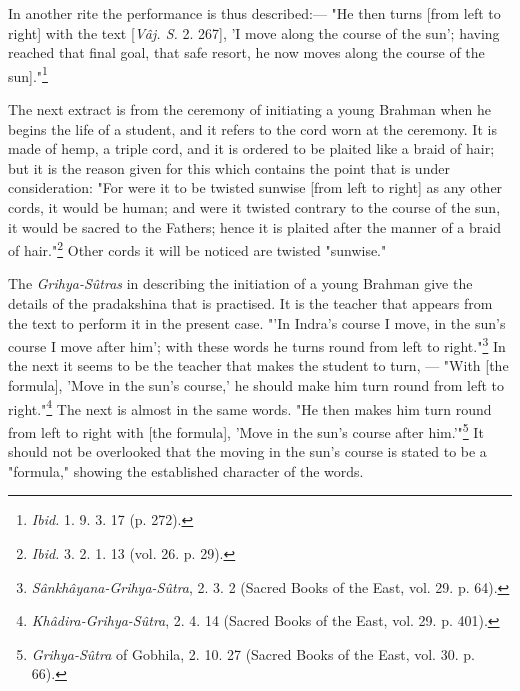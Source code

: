 \documentclass[a4paper, 11pt, oneside, polutonikogreek, english]{article}
\begin{document}
In another rite the performance is thus described:--- "He then turns [from left to right] with the text [\emph{Vâj. S.} 2. 267], 'I move along the course of the sun'; having reached that final goal, that safe resort, he now moves along the course of the sun]."\footnote{\emph{Ibid.} 1. 9. 3. 17 (p. 272).}

The next extract is from the ceremony of initiating a young Brahman when he begins the life of a student, and it refers to the cord worn at the ceremony. It is made of hemp, a triple cord, and it is ordered to be plaited like a braid of hair; but it is the reason given for this which contains the point that is under consideration: "For were it to be twisted sunwise [from left to right] as any other cords, it would be human; and were it twisted contrary to the course of the sun, it would be sacred to the Fathers; hence it is plaited after the manner of a braid of hair."\footnote{\emph{Ibid.} 3. 2. 1. 13 (vol. 26. p. 29).} Other cords it will be noticed are twisted "sunwise."

The \emph{Grihya-Sûtras} in describing the initiation of a young Brahman give the details of the pradakshina that is practised. It is the teacher that appears from the text to perform it in the present case. "'In Indra's course I move, in the sun's course I move after him'; with these words he turns round from left to right."\footnote{\emph{Sânkhâyana-Grihya-Sûtra}, 2. 3. 2 (Sacred Books of the East, vol. 29. p. 64).} In the next it seems to be the teacher that makes the student to turn, --- "With [the formula], 'Move in the sun's course,' he should make him turn round from left to right."\footnote{\emph{Khâdira-Grihya-Sûtra}, 2. 4. 14 (Sacred Books of the East, vol. 29. p. 401).} The next is almost in the same words. "He then makes him turn round from left to right with [the formula], 'Move in the sun's course after him.'"\footnote{\emph{Grihya-Sûtra} of Gobhila, 2. 10. 27 (Sacred Books of the East, vol. 30. p. 66).} It should not be overlooked that the moving in the sun's course is stated to be a "formula," showing the established character of the words.
\end{document}
